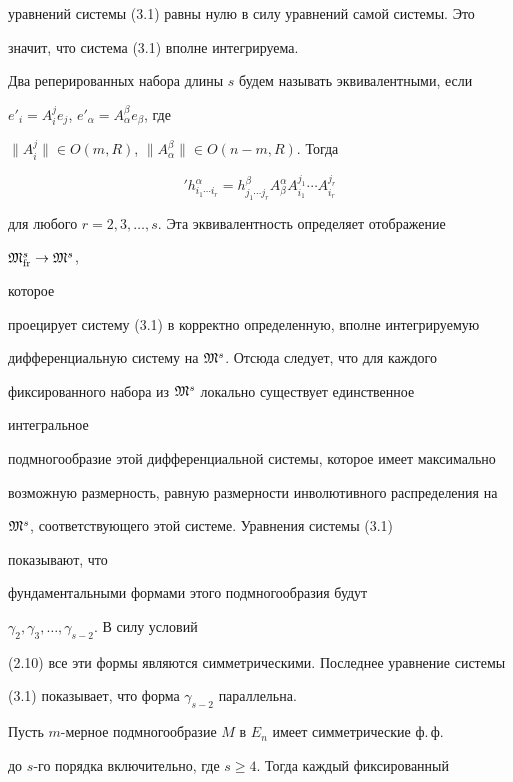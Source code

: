 уравнений системы (3.1) равны нулю в силу уравнений самой системы. Это 


значит, что система (3.1) вполне интегрируема. 


 


Два реперированных набора длины $s$ будем называть эквивалентными, если 


$e'_i=A^j_ie_j$, $e'_\alpha=A^\beta_\alpha e_\beta$, где 


$\|A^j_i\|\in O(m,R)$, $\|A^\beta_\alpha\|\in O(n-m,R)$. Тогда 


$$ 


{}'h^\alpha_{i_1\dotsb i_r}=h^\beta_{j_1\dotsb j_r} 


A^\alpha_\beta A^{j_1}_{i_1}\dotsb A^{j_r}_{i_r} 


$$ 


для любого $r=2,3,\dotsc,s$. Эта эквивалентность определяет отображение 


$\frak M^s_{\text{fr}}\to\frak M^s$, 


которое 


проецирует систему (3.1) в корректно определенную, вполне интегрируемую 


дифференциальную систему на $\frak M^s$. Отсюда следует, что для каждого


фиксированного набора из $\frak M^s$ локально существует единственное 


интегральное 


подмногообразие этой дифференциальной системы, которое имеет максимально 


возможную размерность, равную размерности инволютивного распределения на 


$\frak M^s$, соответствующего этой системе. Уравнения системы (3.1) 


показывают, что 


фундаментальными формами этого подмногообразия будут 


$\gamma_2,\gamma_3,\dotsc,\gamma_{s-2}$. В силу условий 


(2.10) все эти формы являются симметрическими. Последнее уравнение системы 


(3.1) показывает, что форма $\gamma_{s-2}$ параллельна. 


 


Пусть $m$-мерное подмногообразие $M$ в $E_n$ имеет симметрические ф.\,ф. 


до $s$-го порядка включительно, где $s\ge 4$. Тогда каждый фиксированный 


